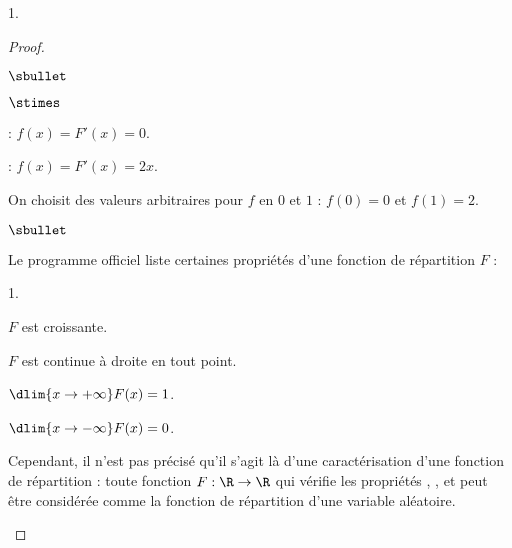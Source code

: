 \documentclass[11pt]{article}%
\begin{document}
\begin{noliste}{1.}
\begin{proof}
\begin{noliste}{$\sbullet$}
\begin{noliste}{$\stimes$}
	\item \dashuline{Si $x\in \ ]1,+\infty[$} : 
	$f(x)=F'(x)=0$.\\[-.3cm]
	
      \item \dashuline{Si $x\in \ ]0,1[$} : $f(x)=F'(x)=2x$.\\[-.3cm]
	
	\item On choisit des valeurs arbitraires pour $f$ en $0$ et $1$ 
	: $f(0)=0$ et $f(1)=2$.
	\end{noliste}
      \end{noliste}
	
\begin{remark}%
  \begin{noliste}{$\sbullet$}
  \item Le programme officiel liste certaines propriétés d'une fonction 
  de répartition $F$ :
    \begin{noliste}{\scriptsize 1.}
    \item $F$ est croissante.
    \item $F$ est continue à droite en tout point.
    \item $\dlim{x\to+\infty} F(x)=1$.
    \item $\dlim{x\to-\infty} F(x)=0$.
    \end{noliste}
    Cependant, il n'est pas précisé qu'il s'agit là d'une
    caractérisation d'une fonction de répartition : toute fonction $F
    : \R \to \R$ qui vérifie les propriétés , ,
     et  peut être considérée comme la fonction de
    répartition d'une variable aléatoire.


\end{noliste}
\end{remark}
\end{proof}
\end{noliste}
\end{document}
